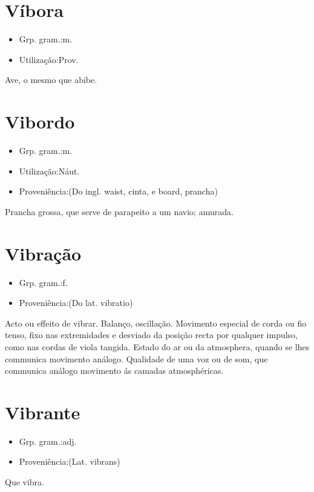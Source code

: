 \documentclass{article}
\begin{document}
\section{Víbora}
\begin{itemize}
\item {Grp. gram.:m.}
\end{itemize}
\begin{itemize}
\item {Utilização:Prov.}
\end{itemize}
Ave, o mesmo que \textunderscore abibe\textunderscore .
\section{Vibordo}
\begin{itemize}
\item {Grp. gram.:m.}
\end{itemize}
\begin{itemize}
\item {Utilização:Náut.}
\end{itemize}
\begin{itemize}
\item {Proveniência:(Do ingl. \textunderscore waist\textunderscore , cinta, e \textunderscore board\textunderscore , prancha)}
\end{itemize}
Prancha grossa, que serve de parapeito a um navio; amurada.
\section{Vibração}
\begin{itemize}
\item {Grp. gram.:f.}
\end{itemize}
\begin{itemize}
\item {Proveniência:(Do lat. \textunderscore vibratio\textunderscore )}
\end{itemize}
Acto ou effeito de vibrar.
Balanço, oscillação.
Movimento especial de corda ou fio tenso, fixo nas extremidades e desviado da posição recta por qualquer impulso, como nas cordas de viola tangida.
Estado do ar ou da atmosphera, quando se lhes communica movimento análogo.
Qualidade de uma voz ou de som, que communica análogo movimento ás camadas atmosphéricas.
\section{Vibrante}
\begin{itemize}
\item {Grp. gram.:adj.}
\end{itemize}
\begin{itemize}
\item {Proveniência:(Lat. \textunderscore vibrans\textunderscore )}
\end{itemize}
Que vibra.
\end{document}
